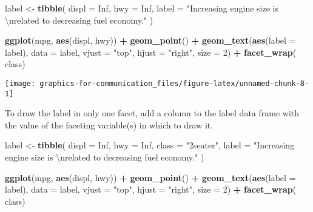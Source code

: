 \documentclass[]{book}
\newenvironment{Shaded}{\begin{snugshade}}{\end{snugshade}}
\newcommand{\CharTok}[1]{\textcolor[rgb]{0.31,0.60,0.02}{#1}}
\newcommand{\DataTypeTok}[1]{\textcolor[rgb]{0.13,0.29,0.53}{#1}}
\newcommand{\DecValTok}[1]{\textcolor[rgb]{0.00,0.00,0.81}{#1}}
\newcommand{\KeywordTok}[1]{\textcolor[rgb]{0.13,0.29,0.53}{\textbf{#1}}}
\newcommand{\NormalTok}[1]{#1}
\newcommand{\OperatorTok}[1]{\textcolor[rgb]{0.81,0.36,0.00}{\textbf{#1}}}
\newcommand{\OtherTok}[1]{\textcolor[rgb]{0.56,0.35,0.01}{#1}}
\newcommand{\StringTok}[1]{\textcolor[rgb]{0.31,0.60,0.02}{#1}}
\theoremstyle{definition}
\theoremstyle{definition}
\theoremstyle{definition}
\theoremstyle{remark}
\begin{document}
\begin{Shaded}
\begin{Highlighting}[]
\NormalTok{label <-}\StringTok{ }\KeywordTok{tibble}\NormalTok{(}
  \DataTypeTok{displ =} \OtherTok{Inf}\NormalTok{,}
  \DataTypeTok{hwy =} \OtherTok{Inf}\NormalTok{,}
  \DataTypeTok{label =} \StringTok{"Increasing engine size is }\CharTok{\textbackslash{}n}\StringTok{related to decreasing fuel economy."}
\NormalTok{)}

\KeywordTok{ggplot}\NormalTok{(mpg, }\KeywordTok{aes}\NormalTok{(displ, hwy)) }\OperatorTok{+}
\StringTok{  }\KeywordTok{geom_point}\NormalTok{() }\OperatorTok{+}
\StringTok{  }\KeywordTok{geom_text}\NormalTok{(}\KeywordTok{aes}\NormalTok{(}\DataTypeTok{label =}\NormalTok{ label), }\DataTypeTok{data =}\NormalTok{ label, }\DataTypeTok{vjust =} \StringTok{"top"}\NormalTok{, }\DataTypeTok{hjust =} \StringTok{"right"}\NormalTok{,}
            \DataTypeTok{size =} \DecValTok{2}\NormalTok{) }\OperatorTok{+}
\StringTok{  }\KeywordTok{facet_wrap}\NormalTok{(}\OperatorTok{~}\StringTok{ }\NormalTok{class)}
\end{Highlighting}
\end{Shaded}

\begin{center}\texttt{[image: graphics-for-communication\_files/figure-latex/unnamed-chunk-8-1]} \end{center}

To draw the label in only one facet, add a column to the label data
frame with the value of the faceting variable(s) in which to draw it.

\begin{Shaded}
\begin{Highlighting}[]
\NormalTok{label <-}\StringTok{ }\KeywordTok{tibble}\NormalTok{(}
  \DataTypeTok{displ =} \OtherTok{Inf}\NormalTok{,}
  \DataTypeTok{hwy =} \OtherTok{Inf}\NormalTok{,}
  \DataTypeTok{class =} \StringTok{"2seater"}\NormalTok{,}
  \DataTypeTok{label =} \StringTok{"Increasing engine size is }\CharTok{\textbackslash{}n}\StringTok{related to decreasing fuel economy."}
\NormalTok{)}

\KeywordTok{ggplot}\NormalTok{(mpg, }\KeywordTok{aes}\NormalTok{(displ, hwy)) }\OperatorTok{+}
\StringTok{  }\KeywordTok{geom_point}\NormalTok{() }\OperatorTok{+}
\StringTok{  }\KeywordTok{geom_text}\NormalTok{(}\KeywordTok{aes}\NormalTok{(}\DataTypeTok{label =}\NormalTok{ label), }\DataTypeTok{data =}\NormalTok{ label, }\DataTypeTok{vjust =} \StringTok{"top"}\NormalTok{, }\DataTypeTok{hjust =} \StringTok{"right"}\NormalTok{,}
            \DataTypeTok{size =} \DecValTok{2}\NormalTok{) }\OperatorTok{+}
\StringTok{  }\KeywordTok{facet_wrap}\NormalTok{(}\OperatorTok{~}\StringTok{ }\NormalTok{class)}
\end{Highlighting}
\end{Shaded}
\end{document}
